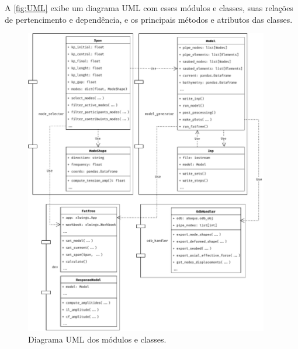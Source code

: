 A \autoref{fig:UML} exibe um diagrama UML com esses módulos e classes, suas relações de pertencimento e dependência, e os principais métodos e atributos das classes.

\begin{figure}[!ht]
    \centering
    \caption{Diagrama UML dos módulos e classes.}\label{fig:UML}
    \includegraphics[width=0.95\textwidth]{imagens/UML}
\end{figure}

